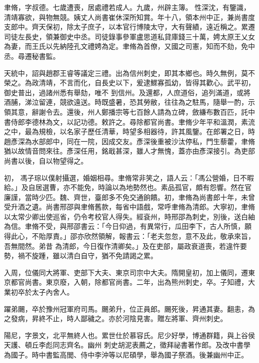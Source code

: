 \begin{pinyinscope}
 聿脩，字叔德。七歲遭喪，居處禮若成人。九歲，州辟主簿。
 性深沈，有鑒識，清靖寡欲，與物無競。姨丈人尚書崔休深所知賞。年十八，領本州中正，兼尚書度支郎中。齊天保初，除太子庶子，以本官行博陵太守，大有聲績，遠近稱之。累遷司徒左長史，領兼御史中丞。司徒錄事參軍盧思道私貸庫錢三十萬，娉太原王乂女為妻，而王氏以先納陸孔文禮娉為定。聿脩為首僚，又國之司憲，知而不劾，免中丞。尋遷秘書監。



 天統中，詔與趙郡王睿等議定三禮。出為信州刺史，即其本鄉也。時久無例，莫不榮之。為政清靖，不言而化，自長史以下，爰逮鰥寡孤幼，皆得其歡心。武平初，御史普出，過諸州悉有舉劾，唯不
 到信州。及還都，人庶道俗，追列滿道，或將酒脯，涕泣留連，競欲遠送。時既盛暑，恐其勞敝，往往為之駐馬，隨舉一酌，示領其意，辭謝令去。還後，州人鄭播宗等七百餘人請為立碑，斂縑布數百匹，託中書侍郎李德林為文，以記功德。敕許之。尋除都官尚書。聿脩少年平和溫潤，素流之中，最為規檢，以名家子歷任清華，時望多相器待，許其風鑒。在郎署之日，時趙彥深為水部郎中，同在一院，因成交友。彥深後重被沙汰停私，門生藜藿，聿脩猶以故情音問來往。彥深任用，銘戢甚深，雖人才無愧，蓋亦由彥深接引。為吏部尚書以後，自以物望得之。



 初，
 馮子琮以僕射攝選，婚姻相尋。聿脩常非笑之，語人云：「馮公營婚，日不暇給。」及自居選曹，亦不能免，時論以為地勢然也。素品孤官，頗有怨響。然在官廉謹，當時少匹。魏、齊世，臺郎多不免交通餉饋。初，聿脩為尚書郎十年，未曾受升酒之遺。尚書邢邵與聿脩舊款，每省中語戲，常呼聿脩為清郎。大寧初，聿脩以太常少卿出使巡省，仍令考校官人得失。經袞州，時邢邵為刺史，別後，送白紬為信。聿脩不受，與邢邵書云：「今日仰過，有異常行，瓜田李下，古人所慎，願得此心，不貽厚責。」邵亦欣然領解，報書云：「老夫忽忽，意不及此，敬承來旨，吾無間然。弟昔
 為清郎，今日復作清卿矣。」及在吏部，屬政衰道喪，若違忤要勢，禍不旋踵，雖以清白自守，猶不免請謁之累。



 入周，位儀同大將軍、吏部下大夫、東京司宗中大夫。隋開皇初，加上儀同，遷東京都官尚書。東京廢，入朝，除都官尚書。二年，出為熊州刺史，卒。子知禮，大業初卒於太子內舍人。



 躍弟颺，卒於豫州冠軍府司馬。颺弟升，位正員郎。颺死後，昇通其妻。翻恚，為之發病，昇終不止，時人鄙穢之。亦於河陰見害。贈左將軍、齊州刺史。



 陽尼，字景文，北平無終人也。累世仕於慕容氏。尼少好學，博通群籍，與上谷侯天護、頓丘李彪同志齊名。幽州
 刺史胡泥表薦之，徵拜祕書著作郎。及改中書學為國子。時中書監高閭、侍中李沖等以尼碩學，舉為國子祭酒。後兼幽州中正。




\end{pinyinscope}

